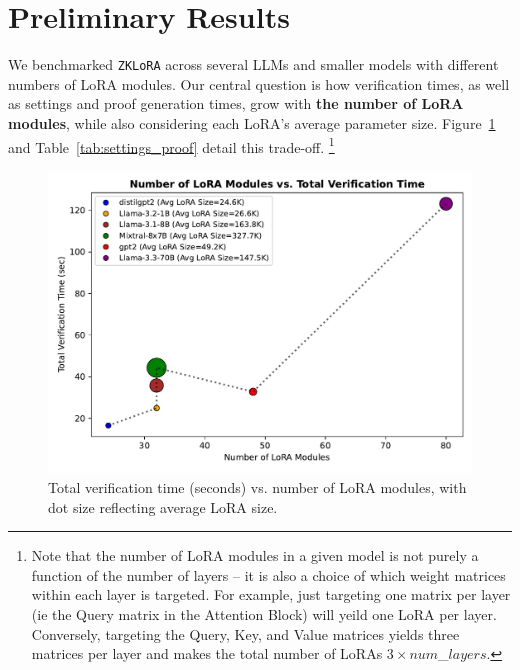 \documentclass[11pt]{article}
\begin{document}
\section{Preliminary Results}

We benchmarked \texttt{ZKLoRA} across several LLMs and smaller models with different numbers of LoRA modules. 
Our central question is how verification times, as well as settings and proof generation times, grow with \textbf{the number of LoRA modules}, while also considering each LoRA's average parameter size. 
Figure~\ref{fig:verify_vs_numlora} and Table~\ref{tab:settings_proof} detail this trade-off. \footnote{Note that the number of LoRA modules in a given model is not purely a function of the number of layers -- it is also a choice of which weight matrices within each layer is targeted. For example, just targeting one matrix per layer (ie the Query matrix in the Attention Block) will yeild one LoRA per layer. Conversely, targeting the Query, Key, and Value matrices yields three matrices per layer and makes the total number of LoRAs $3 \times num$\_$layers$.}

\begin{figure}[ht]
    \centering
    \includegraphics[width=0.9\linewidth]{figs/fig_verify_vs_numlora.pdf}
    \caption{Total verification time (seconds) vs. number of LoRA modules, with dot size reflecting average LoRA size.}
    \label{fig:verify_vs_numlora}
\end{figure}
\end{document}
